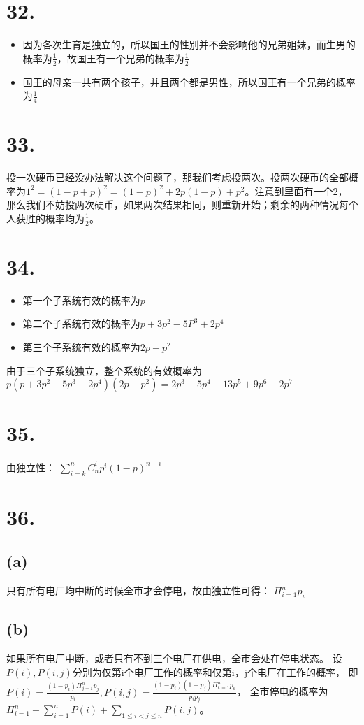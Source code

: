 \documentclass[UTF8]{report}
\begin{document}
    \section*{32.}
        \begin{itemize}
            \item 因为各次生育是独立的，所以国王的性别并不会影响他的兄弟姐妹，而生男的概率为$\frac{1}{2}$，故国王有一个兄弟的概率为$\frac{1}{2}$
            \item 国王的母亲一共有两个孩子，并且两个都是男性，所以国王有一个兄弟的概率为$\frac{1}{4}$
        \end{itemize}
    \section*{33.}
        投一次硬币已经没办法解决这个问题了，那我们考虑投两次。投两次硬币的全部概率为$1^2 = (1 - p + p)^2 = (1 - p)^2 + 2p(1 - p) + p^2$。注意到里面有一个2，
        那么我们不妨投两次硬币，如果两次结果相同，则重新开始；剩余的两种情况每个人获胜的概率均为$\frac{1}{2}$。
    \section*{34.}
        \begin{itemize}
            \item 第一个子系统有效的概率为$p$
            \item 第二个子系统有效的概率为$p + 3p^2 - 5P^3 + 2p^4$
            \item 第三个子系统有效的概率为$2p - p^2$
        \end{itemize}
        由于三个子系统独立，整个系统的有效概率为$p(p + 3p^2 - 5p^3 + 2p^4)(2p - p^2) = 2p^3 + 5p^4 -13p^5 + 9p^6 -2p^7$
    \section*{35.}
        由独立性：
        $\sum_{i = k}^nC^i_np^i(1 - p)^{n - i}$
    \section*{36.}
        \subsection*{(a)}
            只有所有电厂均中断的时候全市才会停电，故由独立性可得：
            $\Pi_{i = 1}^np_i$
        \subsection*{(b)}
            如果所有电厂中断，或者只有不到三个电厂在供电，全市会处在停电状态。
            设$P(i), P(i, j)$分别为仅第i个电厂工作的概率和仅第i，j个电厂在工作的概率，
            即$P(i) = \frac{(1 - p_i)\Pi_{j = 1}^np_j}{p_i}, P(i, j) = \frac{(1 - p_i)(1 - p_j)\Pi_{k = 1}^np_k}{p_ip_j}$，
            全市停电的概率为$\Pi_{i = 1}^n + \sum_{i = 1}^nP(i) + \sum_{1 \leq i < j \leq n}P(i, j)$。
\end{document}

